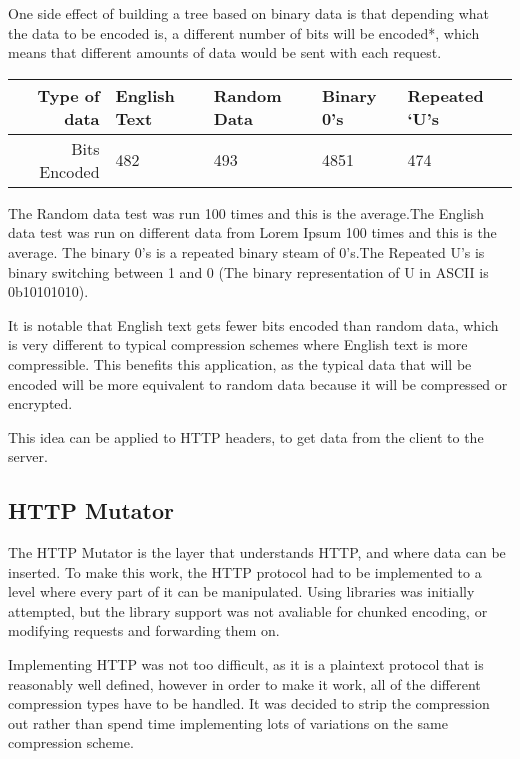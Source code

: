 \newpage
One side effect of building a tree based on binary data is that depending what the data to be encoded is, a different number of bits will be encoded*, which means that different amounts of data would be sent with each request.

\begin{table}[ht]
\begin{tabular}{@{}rllll@{}}
\toprule
Type of data & English Text & Random Data & Binary 0's & Repeated `U's \\ \midrule
Bits Encoded & 482 & 493 & 4851 & 474 \\ \bottomrule
\end{tabular}
\end{table}
{\small * The Random data test was run 100 times and this is the average.The English data test was run on different data from Lorem Ipsum 100 times and this is the average. The binary 0's is a repeated binary steam of 0's.The Repeated U's is binary switching between 1 and 0 (The binary representation of U in ASCII is 0b10101010).}\par
\vspace{0.5cm}
It is notable that English text gets fewer bits encoded than random data, which is very different to typical compression schemes where English text is more compressible. This benefits this application, as the typical data that will be encoded will be more equivalent to random data because it will be compressed or encrypted.

This idea can be applied to HTTP headers, to get data from the client to the server.

\subsection{HTTP Mutator}
The HTTP Mutator is the layer that understands HTTP, and where data can be inserted.
To make this work, the HTTP protocol had to be implemented to a level where every part of it can be manipulated. Using libraries was initially attempted, but the library support was not avaliable for chunked encoding, or modifying requests and forwarding them on.\par
Implementing HTTP was not too difficult, as it is a plaintext protocol that is reasonably well defined, however in order to make it work, all of the different compression types have to be handled. It was decided to strip the compression out rather than spend time implementing lots of variations on the same compression scheme.\par

